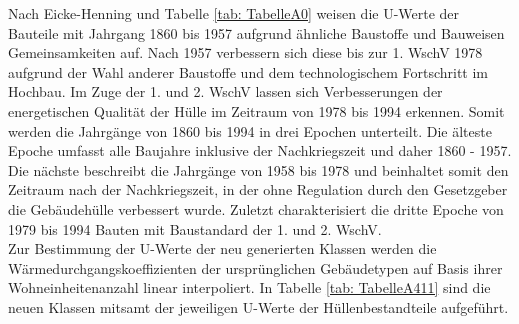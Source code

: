 Nach Eicke-Henning \cite{EickeHenning.2011} und Tabelle \ref{tab: TabelleA0} weisen die U-Werte der Bauteile mit Jahrgang 1860 bis 1957 aufgrund ähnliche Baustoffe und Bauweisen Gemeinsamkeiten auf.
Nach 1957 verbessern sich diese bis zur 1. WschV 1978 aufgrund der Wahl anderer Baustoffe und dem technologischem Fortschritt im Hochbau.
Im Zuge der 1. und 2. WschV lassen sich Verbesserungen der energetischen Qualität der Hülle im Zeitraum von 1978 bis 1994 erkennen.
Somit werden die Jahrgänge von 1860 bis 1994 in drei Epochen unterteilt.
Die älteste Epoche umfasst alle Baujahre inklusive der Nachkriegszeit und daher 1860 - 1957.
Die nächste beschreibt die Jahrgänge von 1958 bis 1978 und beinhaltet somit den Zeitraum nach der Nachkriegszeit, in der ohne Regulation durch den Gesetzgeber die Gebäudehülle verbessert wurde.
Zuletzt charakterisiert die dritte Epoche von 1979 bis 1994 Bauten mit Baustandard der 1. und 2. WschV.\\
Zur Bestimmung der U-Werte der neu generierten Klassen werden die Wärmedurchgangskoeffizienten der ursprünglichen Gebäudetypen auf Basis ihrer Wohneinheitenanzahl linear interpoliert.
In Tabelle \ref{tab: TabelleA411} sind die neuen Klassen mitsamt der jeweiligen U-Werte der Hüllenbestandteile aufgeführt.

